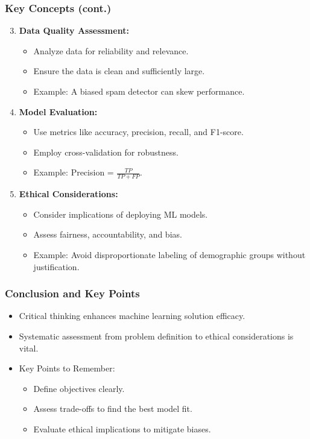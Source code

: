 \documentclass[aspectratio=169]{beamer}
\begin{document}
\begin{frame}[fragile]
    \frametitle{Key Concepts (cont.)}
    \begin{enumerate}
        \setcounter{enumi}{2} %
        \item \textbf{Data Quality Assessment:}
        \begin{itemize}
            \item Analyze data for reliability and relevance.
            \item Ensure the data is clean and sufficiently large.
            \item Example: A biased spam detector can skew performance.
        \end{itemize}

        \item \textbf{Model Evaluation:}
        \begin{itemize}
            \item Use metrics like accuracy, precision, recall, and F1-score.
            \item Employ cross-validation for robustness.
            \item Example: Precision = $\frac{TP}{TP + FP}$.
        \end{itemize}

        \item \textbf{Ethical Considerations:}
        \begin{itemize}
            \item Consider implications of deploying ML models.
            \item Assess fairness, accountability, and bias.
            \item Example: Avoid disproportionate labeling of demographic groups without justification.
        \end{itemize}
    \end{enumerate}
\end{frame}

\begin{frame}[fragile]
    \frametitle{Conclusion and Key Points}
    \begin{itemize}
        \item Critical thinking enhances machine learning solution efficacy.
        \item Systematic assessment from problem definition to ethical considerations is vital.
        \item Key Points to Remember:
        \begin{itemize}
            \item Define objectives clearly.
            \item Assess trade-offs to find the best model fit.
            \item Evaluate ethical implications to mitigate biases.
        \end{itemize}
    \end{itemize}
\end{frame}
\end{document}
